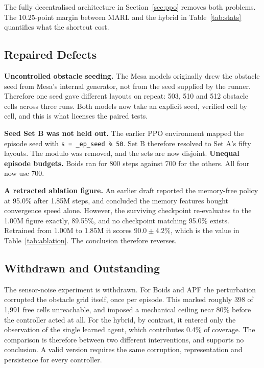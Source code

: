 \documentclass[a4paper, 10pt, conference]{ieeeconf}
\begin{document}
The fully decentralised architecture in Section~\ref{sec:ppo} removes
both problems. The 10.25-point margin between MARL and the hybrid in
Table~\ref{tab:stats} quantifies what the shortcut cost.

\subsection{Repaired Defects}

\textbf{Uncontrolled obstacle seeding.} The Mesa models originally
drew the obstacle seed from Mesa's internal generator, not from the
seed supplied by the runner. Therefore one seed gave different layouts
on repeat: 503, 510 and 512 obstacle cells across three runs. Both
models now take an explicit seed, verified cell by cell, and this is
what licenses the paired tests.

\textbf{Seed Set B was not held out.} The earlier PPO environment
mapped the episode seed with \texttt{s = \_ep\_seed \% 50}. Set B
therefore resolved to Set A's fifty layouts. The modulo was removed,
and the sets are now disjoint. \textbf{Unequal episode budgets.} Boids
ran for 800 steps against 700 for the others. All four now use 700.

\textbf{A retracted ablation figure.} An earlier draft reported the
memory-free policy at 95.0\% after 1.85M steps, and concluded the
memory features bought convergence speed alone. However, the surviving
checkpoint re-evaluates to the 1.00M figure exactly, 89.55\%, and no
checkpoint matching 95.0\% exists. Retrained from 1.00M to 1.85M it
scores $90.0\pm4.2\%$, which is the value in Table~\ref{tab:ablation}.
The conclusion therefore reverses.

\subsection{Withdrawn and Outstanding}

The sensor-noise experiment is withdrawn. For Boids and APF the
perturbation corrupted the obstacle grid itself, once per episode.
This marked roughly 398 of 1{,}991 free cells unreachable, and imposed
a mechanical ceiling near 80\% before the controller acted at all. For
the hybrid, by contrast, it entered only the observation of the single
learned agent, which contributes 0.4\% of coverage. The comparison is
therefore between two different interventions, and supports no
conclusion. A valid version requires the same corruption,
representation and persistence for every controller.
\end{document}
